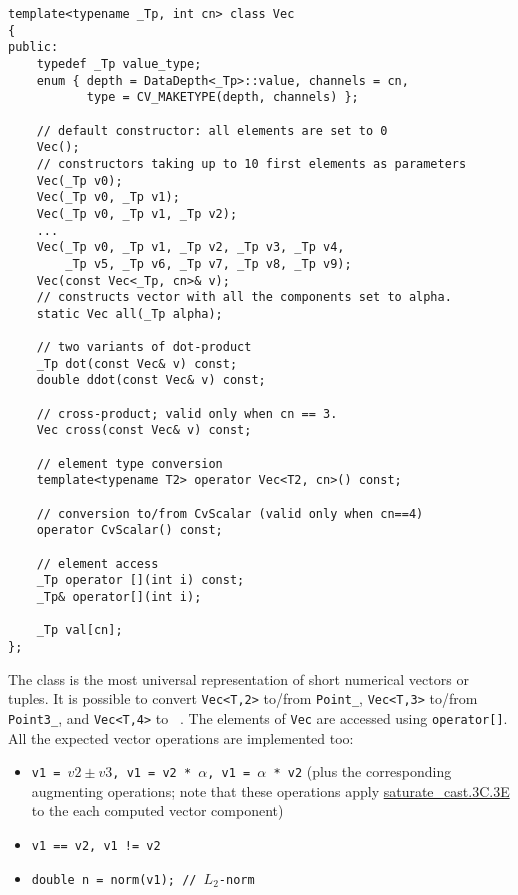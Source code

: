 \begin{lstlisting}
template<typename _Tp, int cn> class Vec
{
public:
    typedef _Tp value_type;
    enum { depth = DataDepth<_Tp>::value, channels = cn,
           type = CV_MAKETYPE(depth, channels) };
    
    // default constructor: all elements are set to 0
    Vec();
    // constructors taking up to 10 first elements as parameters
    Vec(_Tp v0);
    Vec(_Tp v0, _Tp v1);
    Vec(_Tp v0, _Tp v1, _Tp v2);
    ...
    Vec(_Tp v0, _Tp v1, _Tp v2, _Tp v3, _Tp v4,
        _Tp v5, _Tp v6, _Tp v7, _Tp v8, _Tp v9);
    Vec(const Vec<_Tp, cn>& v);
    // constructs vector with all the components set to alpha.
    static Vec all(_Tp alpha);
    
    // two variants of dot-product
    _Tp dot(const Vec& v) const;
    double ddot(const Vec& v) const;
    
    // cross-product; valid only when cn == 3.
    Vec cross(const Vec& v) const;
    
    // element type conversion
    template<typename T2> operator Vec<T2, cn>() const;
    
    // conversion to/from CvScalar (valid only when cn==4)
    operator CvScalar() const;
    
    // element access
    _Tp operator [](int i) const;
    _Tp& operator[](int i);

    _Tp val[cn];
};
\end{lstlisting}

The class is the most universal representation of short numerical vectors or tuples. It is possible to convert \texttt{Vec<T,2>} to/from \texttt{Point\_}, \texttt{Vec<T,3>} to/from \texttt{Point3\_}, and \texttt{Vec<T,4>} to ~. The elements of \texttt{Vec} are accessed using \texttt{operator[]}. All the expected vector operations are implemented too:

\begin{itemize}
    \item \texttt{v1 = $v2 \pm v3$, v1 = v2 * $\alpha$, v1 = $\alpha$ * v2} (plus the corresponding augmenting operations; note that these operations apply \hyperref[saturatecast]{saturate\_cast.3C.3E} to the each computed vector component)
    \item \texttt{v1 == v2, v1 != v2}
    \item \texttt{double n = norm(v1); // $L_2$-norm}
\end{itemize}

